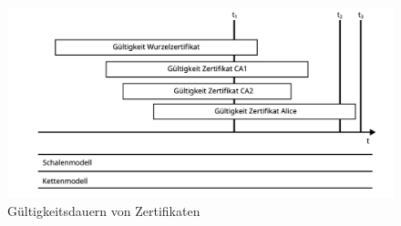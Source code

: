 \begin{figure}
  \centering
  \includegraphics[width=.6\textwidth]{res/zertifikate-3.png}
  \caption{Gültigkeitsdauern von Zertifikaten}
  \label{fig:zertifikate3}
\end{figure}